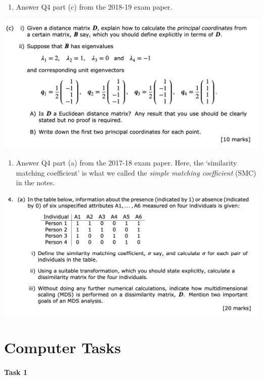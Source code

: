 \documentclass[
]{book}
\providecommand{\tightlist}{%
  \setlength{\itemsep}{0pt}\setlength{\parskip}{0pt}}
\theoremstyle{definition}
\theoremstyle{definition}
\theoremstyle{definition}
\theoremstyle{definition}
\theoremstyle{remark}
\begin{document}
\begin{enumerate}
\def\labelenumi{\arabic{enumi}.}
\setcounter{enumi}{3}
\tightlist
\item
  Answer Q4 part (c) from the 2018-19 exam paper.
\end{enumerate}

\includegraphics{figs/MDS_2018_19_Q4.png}

\begin{enumerate}
\def\labelenumi{\arabic{enumi}.}
\setcounter{enumi}{4}
\tightlist
\item
  Answer Q4 part (a) from the 2017-18 exam paper. Here, the `similarity matching coefficient' is what we called the \emph{simple matching coefficient} (SMC) in the notes.
\end{enumerate}

\includegraphics{figs/MDS_2017_18_Q4.png}

\hypertarget{computer-tasks-2}{%
\section{Computer Tasks}\label{computer-tasks-2}}

\hypertarget{task-1-1}{%
\paragraph*{Task 1}\label{task-1-1}}
\end{document}
